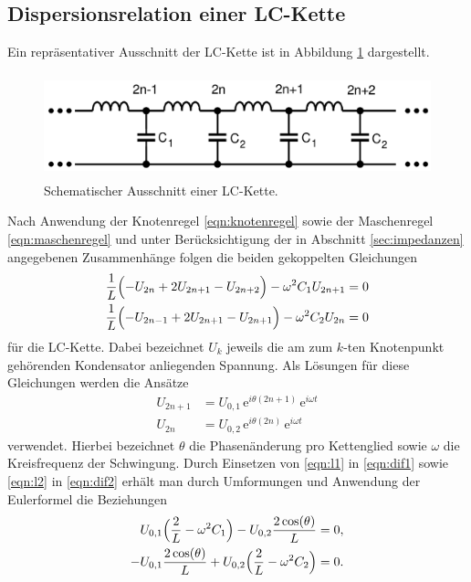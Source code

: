 \subsection{Dispersionsrelation einer LC-Kette}
\label{sec:dispersion}
Ein repräsentativer Ausschnitt der LC-Kette ist in Abbildung \ref{tfig:1} dargestellt.
\begin{figure}[H]
  \centering
  \includegraphics[height=3cm]{theorie_1.png}
  \caption{Schematischer Ausschnitt einer LC-Kette. \cite{sample}}
  \label{tfig:1}
\end{figure}
Nach Anwendung der Knotenregel \eqref{eqn:knotenregel} sowie der Maschenregel \eqref{eqn:maschenregel} und unter Berücksichtigung der in Abschnitt \ref{sec:impedanzen} angegebenen Zusammenhänge folgen die beiden gekoppelten Gleichungen
\begin{align}
  \label{eqn:dif1}
  \frac{1}{L} \Bigl( -U_{2n} + 2 U_{2n+1} - U_{2n+2} \Bigr) - \omega^2 C_1 U_{2n+1} &= 0 \\
  \label{eqn:dif2}
  \frac{1}{L} \Bigl( -U_{2n-1} + 2 U_{2n+1} - U_{2n+1} \Bigr) - \omega^2 C_2 U_{2n} &= 0
\end{align}
für die LC-Kette.
Dabei bezeichnet $U_k$ jeweils die am zum $k$-ten Knotenpunkt gehörenden Kondensator anliegenden Spannung.
Als Lösungen für diese Gleichungen werden die Ansätze
\begin{align}
  \label{eqn:l1}
U_{2n+1} &= U_{0,1} \, \mathrm{e}^{i \theta (2n+1)} \, \mathrm{e}^{ i \omega t} \\
  \label{eqn:l2}
U_{2n} &= U_{0,2} \, \mathrm{e}^{i \theta (2n)} \, \mathrm{e}^{ i \omega t}
\end{align}
verwendet.
Hierbei bezeichnet $\theta$ die Phasenänderung pro Kettenglied sowie $\omega$ die Kreisfrequenz der Schwingung.
Durch Einsetzen von \eqref{eqn:l1} in \eqref{eqn:dif1} sowie \eqref{eqn:l2} in \eqref{eqn:dif2} erhält man durch Umformungen und Anwendung der Eulerformel die Beziehungen
\begin{align}
U_{0,1} \Bigl( \frac{2}{L} - \omega^2 C_1  \Bigr) - U_{0,2} \frac{2 \cos (\theta)}{L} &= 0, \\
-U_{0,1} \frac{2 \cos (\theta)}{L} + U_{0,2} \Bigl( \frac{2}{L} - \omega^2 C_2  \Bigr)  &= 0.
\end{align}
